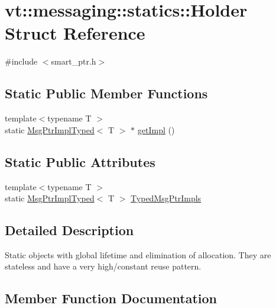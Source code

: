 \hypertarget{structvt_1_1messaging_1_1statics_1_1_holder}{}\section{vt\+:\+:messaging\+:\+:statics\+:\+:Holder Struct Reference}
\label{structvt_1_1messaging_1_1statics_1_1_holder}


{\ttfamily \#include $<$smart\+\_\+ptr.\+h$>$}

\subsection*{Static Public Member Functions}
\begin{DoxyCompactItemize}
\item 
{\footnotesize template$<$typename T $>$ }\\static \hyperlink{structvt_1_1messaging_1_1_msg_ptr_impl_typed}{Msg\+Ptr\+Impl\+Typed}$<$ T $>$ $\ast$ \hyperlink{structvt_1_1messaging_1_1statics_1_1_holder_ab64fd5c54ae9dd41265d599f39e3596f}{get\+Impl} ()
\end{DoxyCompactItemize}
\subsection*{Static Public Attributes}
\begin{DoxyCompactItemize}
\item 
{\footnotesize template$<$typename T $>$ }\\static \hyperlink{structvt_1_1messaging_1_1_msg_ptr_impl_typed}{Msg\+Ptr\+Impl\+Typed}$<$ T $>$ \hyperlink{structvt_1_1messaging_1_1statics_1_1_holder_aa2947eaef3eac9d1ad3e25cdf5e75b5b}{Typed\+Msg\+Ptr\+Impls}
\end{DoxyCompactItemize}


\subsection{Detailed Description}
Static objects with global lifetime and elimination of allocation. They are stateless and have a very high/constant reuse pattern. 

\subsection{Member Function Documentation}
\mbox{\label{structvt_1_1messaging_1_1statics_1_1_holder_ab64fd5c54ae9dd41265d599f39e3596f}} 
